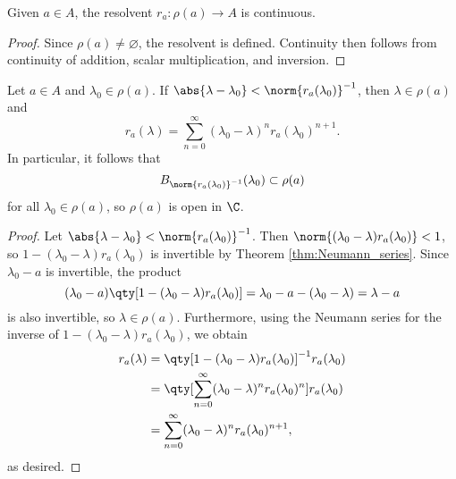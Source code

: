 \begin{corollary}
Given $a \in A$, the resolvent $r_a:\rho(a) \rightarrow A$ is continuous. 
\end{corollary}

\begin{proof}
Since $\rho(a) \neq \varnothing$, the resolvent is defined. Continuity then follows from continuity of addition, scalar multiplication, and inversion.
\end{proof}


\begin{corollary}\label{cor:resolvent_is_open}
Let $a \in A$ and $\lambda_0 \in \rho(a)$. If $\abs{\lambda - \lambda_0} < \norm{r_a(\lambda_0)}^{-1}$, then $\lambda \in \rho(a)$ and
\begin{equation}
r_a(\lambda) = \sum_{n=0}^\infty (\lambda_0 - \lambda)^n r_a(\lambda_0)^{n+1}.
\end{equation}
In particular, it follows that
\begin{equation}
B_{\norm{r_a(\lambda_0)}^{-1}}(\lambda_0) \subset \rho(a)
\end{equation}
for all $\lambda_0 \in \rho(a)$, so $\rho(a)$ is open in $\C$.
\end{corollary}


\begin{proof}
Let $\abs{\lambda - \lambda_0} < \norm{r_a(\lambda_0)}^{-1}$. Then $\norm{(\lambda_0 - \lambda)r_a(\lambda_0)} < 1$, so $1 - (\lambda_0 - \lambda)r_a(\lambda_0)$ is invertible by Theorem \ref{thm:Neumann_series}. Since $\lambda_0 - a$ is invertible, the product
\begin{equation}
(\lambda_0 - a)\qty[1 - (\lambda_0 - \lambda)r_a(\lambda_0)] = \lambda_0 - a - (\lambda_0 - \lambda) = \lambda - a
\end{equation}
is also invertible, so $\lambda \in \rho(a)$. Furthermore, using the Neumann series for the inverse of $1 - (\lambda_0 - \lambda)r_a(\lambda_0)$, we obtain
\begin{equation}
\begin{aligned}
r_a(\lambda) &= \qty[1 - (\lambda_0 - \lambda)r_a(\lambda_0)]^{-1} r_a(\lambda_0)\\
&= \qty[\sum_{n=0}^\infty (\lambda_0 - \lambda)^n r_a(\lambda_0)^n]r_a(\lambda_0)\\
&= \sum_{n=0}^\infty (\lambda_0 - \lambda)^n r_a(\lambda_0)^{n+1},
\end{aligned}
\end{equation}
as desired.
\end{proof}

